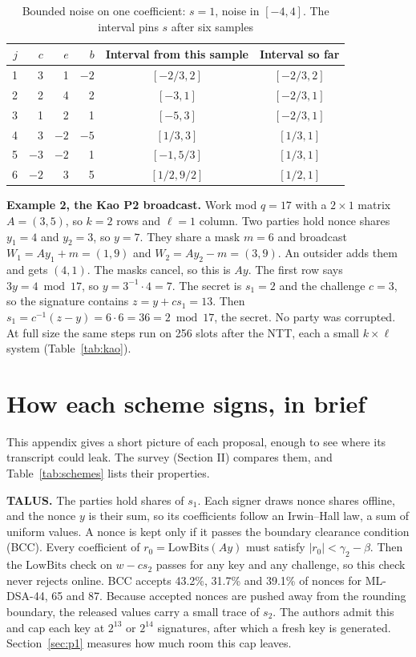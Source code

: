 \documentclass[10pt,conference,a4paper]{IEEEtran}
\newcommand{\LB}{\mathrm{LowBits}}
\begin{document}
\begin{table}[t]
\caption{Bounded noise on one coefficient: $s=1$, noise in $[-4,4]$. The interval pins $s$ after six samples}\label{tab:toy}
\centering\footnotesize
\begin{tabular}{@{}rrrrcc@{}}
\toprule
$j$ & $c$ & $e$ & $b$ & Interval from this sample & Interval so far\\
\midrule
1 & 3 & 1 & $-2$ & $[-2/3,2]$ & $[-2/3,2]$\\
2 & 2 & 4 & 2 & $[-3,1]$ & $[-2/3,1]$\\
3 & 1 & 2 & 1 & $[-5,3]$ & $[-2/3,1]$\\
4 & 3 & $-2$ & $-5$ & $[1/3,3]$ & $[1/3,1]$\\
5 & $-3$ & $-2$ & 1 & $[-1,5/3]$ & $[1/3,1]$\\
6 & $-2$ & 3 & 5 & $[1/2,9/2]$ & $[1/2,1]$\\
\bottomrule
\end{tabular}
\end{table}

\textbf{Example 2, the Kao P2 broadcast.} Work mod $q=17$ with a $2\times1$ matrix $A=(3,5)$, so $k=2$ rows and $\ell=1$
column. Two parties hold nonce shares $y_1=4$ and $y_2=3$, so $y=7$. They share a mask $m=6$ and broadcast
$W_1=A y_1+m=(1,9)$ and $W_2=A y_2-m=(3,9)$. An outsider adds them and gets $(4,1)$. The masks cancel, so this is $Ay$.
The first row says $3y=4 \bmod 17$, so $y=3^{-1}\cdot4=7$. The secret is $s_1=2$ and the challenge $c=3$, so the signature
contains $z=y+c s_1=13$. Then $s_1=c^{-1}(z-y)=6\cdot6=36=2 \bmod 17$, the secret. No party was corrupted. At full size the
same steps run on 256 slots after the NTT, each a small $k\times\ell$ system (Table~\ref{tab:kao}).

\section{How each scheme signs, in brief}\label{app:schemes}
This appendix gives a short picture of each proposal, enough to see where its transcript could leak. The survey
(Section II) compares them, and Table~\ref{tab:schemes} lists their properties.

\textbf{TALUS.} The parties hold shares of $s_1$. Each signer draws nonce shares offline, and the nonce $y$ is their sum, so
its coefficients follow an Irwin--Hall law, a sum of uniform values. A nonce is kept only if it passes the boundary
clearance condition (BCC). Every coefficient of $r_0=\LB(Ay)$ must satisfy $|r_0|<\gamma_2-\beta$. Then the $\LB$ check
on $w-c s_2$ passes for any key and any challenge, so this check never rejects online. BCC accepts 43.2\%, 31.7\% and
39.1\% of nonces for ML-DSA-44, 65 and 87. Because accepted nonces are pushed away from the rounding boundary, the released
values carry a small trace of $s_2$. The authors admit this and cap each key at $2^{13}$ or $2^{14}$ signatures, after
which a fresh key is generated. Section~\ref{sec:p1} measures how much room this cap leaves.
\end{document}
